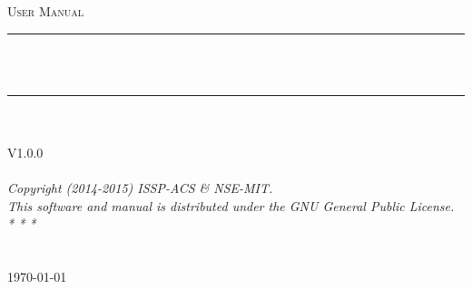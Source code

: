 \documentclass[11pt, a4paper, twoside]{Manual}  %
\title{\ttitle}   %
\begin{document}
\frontmatter  %


\fancyhead{}  %
\rhead{\thepage}  %
\lhead{}  %

\pagestyle{fancy}  %

\newcommand{\HRule}{\rule{\linewidth}{0.5mm}}  %

\hypersetup{pdfsubject=\subjectname}
\hypersetup{pdfauthor=\authornames}
\hypersetup{pdfkeywords=\keywordnames}


\begin{titlepage}
\begin{center}

\textsc{\Large User Manual}\\[0.5cm]  %

\HRule \\[0.4cm] %
{\huge \bfseries \ttitle}\\[0.4cm]  %
\HRule \\[1.5cm] %

\emph{} \\

\textsc{\Large V1.0.0}\\[2.0cm]

\href{http://theory.issp.ac.cn}{\LARGE \authornames}\\[1.5cm]  %

\large \textit{Copyright (2014-2015) ISSP-ACS \& NSE-MIT.}\\
\large \textit{This software and manual is distributed under the GNU General Public License.}\\[5.0cm] %
\textit{* * *}\\[0.5cm]
\groupname\\\deptname\\[0.5cm]  %

{\large \today}\\[4cm] %

\vfill
\end{center}

\end{titlepage}
\end{document}
